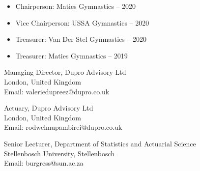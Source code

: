 \begin{itemize}
    \setlength{\itemindent}{0.5em}
    \item \small{Chairperson: Maties Gymnastics -- 2020}
    \item \small{Vice Chairperson: USSA Gymnastics -- 2020}
    \item \small{Treasurer: Van Der Stel Gymnastics -- 2020}
    \item \small{Treasurer: Maties Gymnastics -- 2019}
\end{itemize}





\small{Managing Director, Dupro Advisory Ltd}\\
\small{London, United Kingdom}\\
\small{Email: valeriedupreez@dupro.co.uk}\\

\medskip

\small{Actuary, Dupro Advisory Ltd}\\
\small{London, United Kingdom}\\
\small{Email: rodwelmupambirei@dupro.co.uk}\\

\medskip%

\small{Senior Lecturer, Department of Statistics and Actuarial Science}\\
\small{Stellenbosch University, Stellenbosch}\\
\small{Email: burgress@sun.ac.za}\\
\medskip